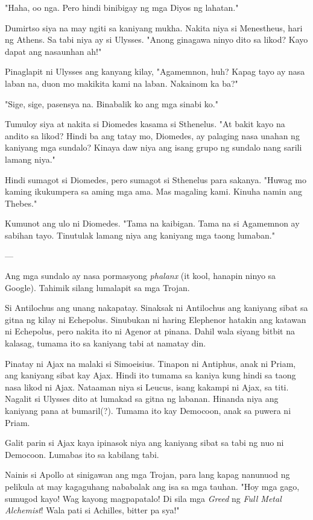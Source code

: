 \documentclass[12pt,letterpaper]{report}
\begin{document}
"Haha, oo nga. Pero hindi binibigay ng mga Diyos ng lahatan."

Dumirtso siya na may ngiti sa kaniyang mukha. Nakita niya si Menestheus, hari ng Athens. Sa tabi niya ay si Ulysses.
"Anong ginagawa ninyo dito sa likod? Kayo dapat ang nasaunhan ah!"

Pinaglapit ni Ulysses ang kanyang kilay, "Agamemnon, huh? Kapag tayo ay nasa laban na,
duon mo makikita kami na laban. Nakainom ka ba?"

"Sige, sige, pasensya na. Binabalik ko ang mga sinabi ko."

Tumuloy siya at nakita si Diomedes kasama si Sthenelus. "At bakit kayo na andito sa likod? Hindi ba ang tatay mo,
Diomedes, ay palaging nasa unahan ng kaniyang mga sundalo? Kinaya daw niya ang isang grupo ng sundalo nang sarili lamang niya."

Hindi sumagot si Diomedes, pero sumagot si Sthenelus para sakanya.
"Huwag mo kaming ikukumpera sa aming mga ama. Mas magaling kami. Kinuha namin ang Thebes."

Kumunot ang ulo ni Diomedes. "Tama na kaibigan. Tama na si Agamemnon ay sabihan tayo.
Tinutulak lamang niya ang kaniyang mga taong lumaban."

---

Ang mga sundalo ay nasa pormasyong \textit{phalanx} (it kool, hanapin ninyo sa Google). Tahimik silang lumalapit sa mga Trojan.

Si Antilochus ang unang nakapatay. Sinaksak ni Antilochus ang kaniyang sibat sa gitna ng kilay ni Echepolus.
Sinubukan ni haring Elephenor hatakin ang katawan ni Echepolus, pero nakita ito ni Agenor at pinana.
Dahil wala siyang bitbit na kalasag, tumama ito sa kaniyang tabi at namatay din.

Pinatay ni Ajax na malaki si Simoeisius. Tinapon ni Antiphus, anak ni Priam, ang kaniyang sibat kay Ajax.
Hindi ito tumama sa kaniya kung hindi sa taong nasa likod ni Ajax. Nataaman niya si Leucus, isang kakampi ni Ajax,
sa titi. Nagalit si Ulysses dito at lumakad sa gitna ng labanan. Hinanda niya ang kaniyang pana at bumaril(?).
Tumama ito kay Democoon, anak sa puwera ni Priam.

Galit parin si Ajax kaya ipinasok niya ang kaniyang sibat sa tabi ng nuo ni Democoon. Lumabas ito sa kabilang tabi.

Nainis si Apollo at sinigawan ang mga Trojan, para lang kapag nanunuod ng pelikula at may kagaguhang nababalak ang isa sa mga tauhan.
"Hoy mga gago, sumugod kayo! Wag kayong magpapatalo!
Di sila mga \textit{Greed} ng \textit{Full Metal Alchemist}! Wala pati si Achilles, bitter pa sya!"
\end{document}

